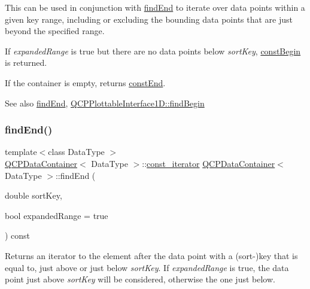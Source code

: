 This can be used in conjunction with \mbox{\hyperlink{class_q_c_p_data_container_afb8b8f23cc2b7234a793a25ce79fe48f}{find\+End}} to iterate over data points within a given key range, including or excluding the bounding data points that are just beyond the specified range.

If {\itshape expanded\+Range} is true but there are no data points below {\itshape sort\+Key}, \mbox{\hyperlink{class_q_c_p_data_container_a49d7622999e2de67fa2331626a3159aa}{const\+Begin}} is returned.

If the container is empty, returns \mbox{\hyperlink{class_q_c_p_data_container_aa7f7cf239b85b1a28de3d675cc5b3da1}{const\+End}}.

\begin{DoxySeeAlso}{See also}
\mbox{\hyperlink{class_q_c_p_data_container_afb8b8f23cc2b7234a793a25ce79fe48f}{find\+End}}, \mbox{\hyperlink{class_q_c_p_plottable_interface1_d_a5b95783271306a4de97be54eac1e7d13}{Q\+C\+P\+Plottable\+Interface1\+D\+::find\+Begin}} 
\end{DoxySeeAlso}
\mbox{\label{class_q_c_p_data_container_afb8b8f23cc2b7234a793a25ce79fe48f}} 
\subsubsection{\texorpdfstring{findEnd()}{findEnd()}}
{\footnotesize\ttfamily template$<$class Data\+Type $>$ \\
\mbox{\hyperlink{class_q_c_p_data_container}{Q\+C\+P\+Data\+Container}}$<$ Data\+Type $>$\+::\mbox{\hyperlink{class_q_c_p_data_container_ae40a91f5cb0bcac61d727427449b7d15}{const\+\_\+iterator}} \mbox{\hyperlink{class_q_c_p_data_container}{Q\+C\+P\+Data\+Container}}$<$ Data\+Type $>$\+::find\+End (\begin{DoxyParamCaption}\item[{double}]{sort\+Key,  }\item[{bool}]{expanded\+Range = {\ttfamily true} }\end{DoxyParamCaption}) const}

Returns an iterator to the element after the data point with a (sort-\/)key that is equal to, just above or just below {\itshape sort\+Key}. If {\itshape expanded\+Range} is true, the data point just above {\itshape sort\+Key} will be considered, otherwise the one just below.


